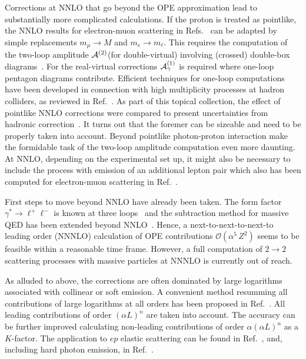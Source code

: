 Corrections at NNLO that go beyond the OPE approximation lead to
substantially more complicated calculations. If the proton is treated
as pointlike, the NNLO results for electron-muon
scattering in Refs.~\cite{Engel:2022kde, Broggio:2022htr} can be adapted by
simple replacements $m_\mu\to{M}$ and $m_e\to{m}_\ell$. This requires the computation of the two-loop amplitude ${\mathcal A}^{(2)} $(for double-virtual) involving (crossed) double-box diagrams~\cite{Bonciani:2021okt}. For the real-virtual corrections ${\mathcal A}_\gamma^{(1)}$ is required where one-loop pentagon diagrams contribute. Efficient techniques for one-loop computations have been developed in connection with high multiplicity processes at hadron colliders, as reviewed in Ref.~\cite{Ellis:2011cr}.
As part of this topical collection, the effect of pointlike NNLO corrections were compared to present uncertainties from hadronic correction~\cite{McMule}.
It turns out that the foremer can be sizeable and need to be properly taken into account.
Beyond pointlike photon-proton interaction make the formidable task of the
two-loop amplitude computation even more
daunting. At NNLO, depending on the experimental set up, it might also
be necessary to include the process with  emission of an additional
lepton pair which also has been computed for electron-muon
scattering in Ref.~\cite{Budassi:2021twh}.

First steps to move beyond NNLO have already been taken. The form factor $\gamma^*\to\ell^+\ell^-$ is known
at three loops~\cite{Fael:2022rgm} and the subtraction method for
massive QED has been extended beyond NNLO~\cite{Engel:2019nfw}. Hence,
a next-to-next-to-next-to leading order (NNNLO) calculation of OPE contributions $\mathcal{O}(\alpha^5\,Z^2)$
seems to be feasible within a reasonable time frame. However, a full
computation of $2\to{2}$ scattering processes with massive particles at
NNNLO is currently out of reach.

As alluded to above, the corrections are often dominated by large
logarithms associated with collinear or soft emission. A convenient
method resumming all contributions of large logarithms at all orders
has been proposed in Ref.~\cite{Kuraev:1985hb}. All leading contributions
of order $(\alpha L)^n$ are taken into account.
The accuracy can be further improved calculating non-leading
contributions of order $\alpha (\alpha L)^n$ as a $K$-factor. The application to $ep$ elastic scattering can be found in
Ref.~\cite{Bystritskiy:2006ju}, and, including hard photon emission,
in Ref.~\cite{Kuraev:2013dra}. 

